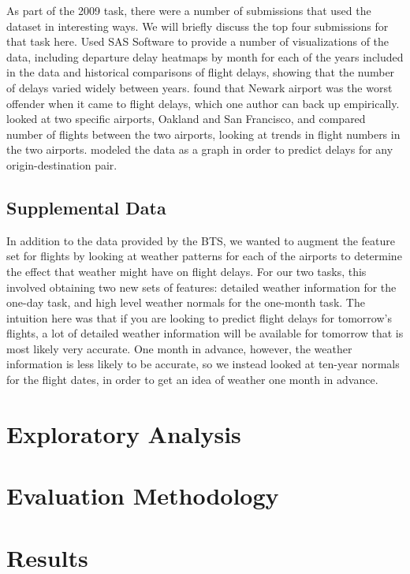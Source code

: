 \documentclass{article}
\begin{document}
As part of the 2009 task, there were a number of submissions that used the dataset in interesting ways. We will briefly discuss the top four submissions for that task here. \cite{wicklin2009congestion} Used SAS Software to provide a number of visualizations of the data, including departure delay heatmaps by month for each of the years included in the data and historical comparisons of flight delays, showing that the number of delays varied widely between years. \cite{hofmann2011delayed} found that Newark airport was the worst offender when it came to flight delays, which one author can back up empirically. \cite{wickham2011tale} looked at two specific airports, Oakland and San Francisco, and compared number of flights between the two airports, looking at trends in flight numbers in the two airports. \cite{dey2009minimizing} modeled the data as a graph in order to predict delays for any origin-destination pair.

\subsection{Supplemental Data}

In addition to the data provided by the BTS, we wanted to augment the feature set for flights by looking at weather patterns for each of the airports to determine the effect that weather might have on flight delays. For our two tasks, this involved obtaining two new sets of features: detailed weather information for the one-day task, and high level weather normals for the one-month task. The intuition here was that if you are looking to predict flight delays for tomorrow's flights, a lot of detailed weather information will be available for tomorrow that is most likely very accurate. One month in advance, however, the weather information is less likely to be accurate, so we instead looked at ten-year normals for the flight dates, in order to get an idea of weather one month in advance.


\section{Exploratory Analysis}

\section{Evaluation Methodology}

\section{Results}



 
\end{document}
